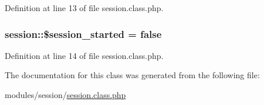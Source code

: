 Definition at line 13 of file session.\-class.\-php.

\hypertarget{classsession_aae3391920555707a71e14e15f2929825}{
\subsubsection[{\$session\-\_\-started}]{\setlength{\rightskip}{0pt plus 5cm}session\-::\$session\-\_\-started = false}}\label{classsession_aae3391920555707a71e14e15f2929825}


Definition at line 14 of file session.\-class.\-php.



The documentation for this class was generated from the following file\-:\begin{DoxyCompactItemize}
\item 
modules/session/\hyperlink{session_8class_8php}{session.\-class.\-php}\end{DoxyCompactItemize}
